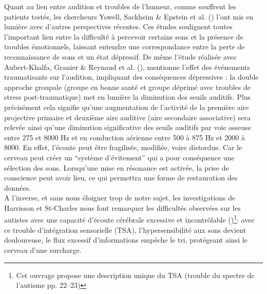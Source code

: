 Quant au lien entre audition et troubles de l'humeur, comme souffrent
les patients testés, les chercheurs Yowell, Sackheim \& Epstein et al. (\citeyear{Yowell}) l'ont mis en 
lumière 
 avec  d'autres perspectives
récentes.
Ces études soulignent toutes 
l'important  lien entre la difficulté
à percevoir certains sons et la présence de troubles émotionnels,
laissant entendre une correspondance 
entre la perte de reconnaissance de
sons et un état dépressif.
De même l'étude réalisée avec Aubert-Khalfa, Granier \& Reynaud et al. (\citeyear{affectiveDisorders}), 
 mentionne l'effet des événements
traumatisants sur l'audition, impliquant des conséquences dépressives :
la double approche groupale (groupe en bonne santé et groupe déprimé avec
troubles de stress post-traumatique) met en lumière la diminution des
  seuils auditifs.
Plus précisément cela signifie qu'une augmentation de l'activité de la
première aire projective primaire et deuxième aire auditive (aire
secondaire associative) sera relevée ainsi qu'une 
diminution significative des
seuils auditifs par voie osseuse  entre
275 et 8000 Hz et en conduction aérienne entre 
500 à 875 Hz et  2000 à 8000.
En effet,  l'écoute peut être fragilisée, modifiée, voire distordue. Car le cerveau peut créer  
un \enquote{système d'évitement} \autocite[cf.][155]{Kabat-Zinn} qui a pour conséquence une sélection 
des sons. 
Lorsqu'une mise en résonance est activée, la prise de conscience peut avoir lieu, ce qui permettra une 
forme de restauration des données.
\\
A l'inverse, et sans nous éloigner trop de notre sujet, les investigations de Harrisson et St-Charles nous 
font remarquer 
les difficultés observées sur les
autistes avec une capacité d'écoute cérébrale excessive et
incontrôlable (\citeyear{harrisson_autisme_2017})\footnote{Cet ouvrage propose une description unique 
du TSA
   (trouble du spectre de l'autisme
   pp. 22--23)}: avec ce trouble d'intégration sensorielle (TSA),
 l'hypersensibilité aux sons devient douloureuse, le flux excessif d'informations empêche le tri, 
 protégeant ainsi le cerveau d'une surcharge.

